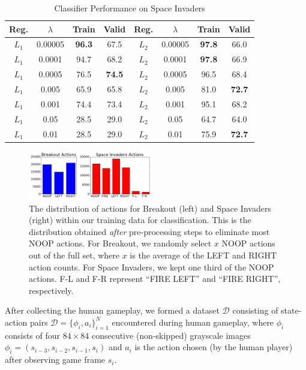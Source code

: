 \documentclass[letterpaper, 10pt, conference]{ieeeconf}
\begin{document}
\begin{table}[!t]
\renewcommand{\arraystretch}{1.3}
\caption{Classifier Performance on Space Invaders}
\label{tab:space_invaders}
\centering
\begin{tabular}{c c c c | c c c c}
\hline
Reg.  & $\lambda$ & Train & Valid & Reg.  & $\lambda$ & Train & Valid \\
\hline
$L_1$ & 0.00005   & \textbf{96.3}  & 67.5  & $L_2$ & 0.00005   & \textbf{97.8}  & 66.0 \\
$L_1$ & 0.0001    & 94.7  & 68.2  & $L_2$ & 0.0001    & \textbf{97.8}  & 66.9 \\
$L_1$ & 0.0005    & 76.5  & \textbf{74.5}  & $L_2$ & 0.0005    & 96.5  & 68.4 \\
$L_1$ & 0.005     & 65.9  & 65.8  & $L_2$ & 0.005     & 81.0  & \textbf{72.7} \\
$L_1$ & 0.001     & 74.4  & 73.4  & $L_2$ & 0.001     & 95.1  & 68.2 \\
$L_1$ & 0.05      & 28.5  & 29.0  & $L_2$ & 0.05      & 64.7  & 64.0 \\
$L_1$ & 0.01      & 28.5  & 29.0  & $L_2$ & 0.01      & 75.9  & \textbf{72.7} \\
\hline
\end{tabular}
\end{table}

\begin{figure}[t]
\centering
\includegraphics[width=0.48\textwidth]{figures/bar_charts_actions.png}
\caption{\footnotesize
The distribution of actions for Breakout (left) and Space Invaders (right)
within our training data for classification. This is the distribution obtained
\emph{after} pre-processing steps to eliminate most NOOP actions. For Breakout,
we randomly select $x$ NOOP actions out of the full set, where $x$ is the
average of the LEFT and RIGHT action counts. For Space Invaders, we kept one
third of the NOOP actions. F-L and F-R represent ``FIRE LEFT'' and ``FIRE
RIGHT'', respectively.
}
\label{fig:action_distribution}
\end{figure}

After collecting the human gameplay, we formed a dataset $\mathcal{D}$
consisting of state-action pairs $\mathcal{D}=\{\phi_i, a_i\}_{i=1}^N$
encountered during human gameplay, where $\phi_i$ consists of four $84\times 84$
consecutive (non-skipped) grayscale images $\phi_i =
(s_{i-3},s_{i-2},s_{i-1},s_i)$ and $a_i$ is the action chosen (by the human
player) after observing game frame $s_i$.
\end{document}
